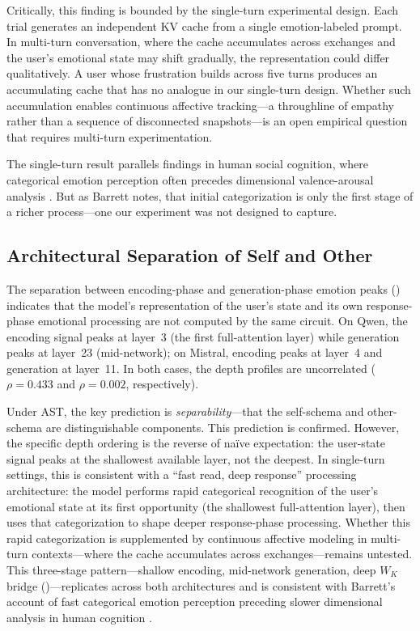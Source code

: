 \documentclass[11pt,a4paper]{article}
\begin{document}
Critically, this finding is bounded by the single-turn experimental design. Each trial generates an independent KV cache from a single emotion-labeled prompt. In multi-turn conversation, where the cache accumulates across exchanges and the user's emotional state may shift gradually, the representation could differ qualitatively. A user whose frustration builds across five turns produces an accumulating cache that has no analogue in our single-turn design. Whether such accumulation enables continuous affective tracking---a throughline of empathy rather than a sequence of disconnected snapshots---is an open empirical question that requires multi-turn experimentation.

The single-turn result parallels findings in human social cognition, where categorical emotion perception often precedes dimensional valence-arousal analysis \citep{barrett2006solving}. But as Barrett notes, that initial categorization is only the first stage of a richer process---one our experiment was not designed to capture.

\subsection{Architectural Separation of Self and Other}

The separation between encoding-phase and generation-phase emotion peaks () indicates that the model's representation of the user's state and its own response-phase emotional processing are not computed by the same circuit. On Qwen, the encoding signal peaks at layer~3 (the first full-attention layer) while generation peaks at layer~23 (mid-network); on Mistral, encoding peaks at layer~4 and generation at layer~11. In both cases, the depth profiles are uncorrelated ($\rho = 0.433$ and $\rho = 0.002$, respectively).

Under AST, the key prediction is \emph{separability}---that the self-schema and other-schema are distinguishable components. This prediction is confirmed. However, the specific depth ordering is the reverse of na\"ive expectation: the user-state signal peaks at the shallowest available layer, not the deepest. In single-turn settings, this is consistent with a ``fast read, deep response'' processing architecture: the model performs rapid categorical recognition of the user's emotional state at its first opportunity (the shallowest full-attention layer), then uses that categorization to shape deeper response-phase processing. Whether this rapid categorization is supplemented by continuous affective modeling in multi-turn contexts---where the cache accumulates across exchanges---remains untested. This three-stage pattern---shallow encoding, mid-network generation, deep $W_K$ bridge ()---replicates across both architectures and is consistent with Barrett's account of fast categorical emotion perception preceding slower dimensional analysis in human cognition \citep{barrett2006solving}.
\end{document}
